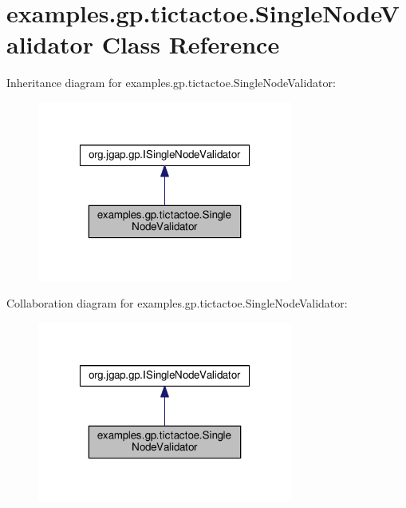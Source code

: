 \hypertarget{classexamples_1_1gp_1_1tictactoe_1_1_single_node_validator}{\section{examples.\-gp.\-tictactoe.\-Single\-Node\-Validator Class Reference}
\label{classexamples_1_1gp_1_1tictactoe_1_1_single_node_validator}
}


Inheritance diagram for examples.\-gp.\-tictactoe.\-Single\-Node\-Validator\-:
\nopagebreak
\begin{figure}[H]
\begin{center}
\leavevmode
\includegraphics[width=238pt]{classexamples_1_1gp_1_1tictactoe_1_1_single_node_validator__inherit__graph}
\end{center}
\end{figure}


Collaboration diagram for examples.\-gp.\-tictactoe.\-Single\-Node\-Validator\-:
\nopagebreak
\begin{figure}[H]
\begin{center}
\leavevmode
\includegraphics[width=238pt]{classexamples_1_1gp_1_1tictactoe_1_1_single_node_validator__coll__graph}
\end{center}
\end{figure}
